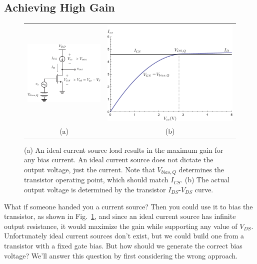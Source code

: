 \subsection{Achieving High Gain}
\begin{figure}[tb]
\centering
\begin{tabular}{cc}
\includegraphics[width=.45\columnwidth]{2cs_current_mirror_load.pdf} &
\includegraphics[width=.45\columnwidth]{mos_output_voltage.pdf}\\
(a) & (b)\\
\end{tabular}
\caption{(a) An ideal current source load results in the maximum gain for any bias current.  An ideal current source does not dictate the output voltage, just the current.  Note that $V_{bias,Q}$ determines the transistor operating point, which should match $I_{CS}$.  (b) The actual output voltage is determined by the transistor $I_{DS}$-$V_{DS}$ curve.}
\label{fig:2cs_current_mirror_load.pdf}
\end{figure}
What if someone handed you a current source?  Then you could use it to bias the transistor, as shown in Fig.~\ref{fig:2cs_current_mirror_load.pdf}, and since an ideal current source has infinite output resistance, it would maximize the gain while supporting any value of $V_{DS}$.  Unfortunately ideal current sources don't exist, but we could build one from a transistor with a fixed gate bias.  But how should we generate the correct bias voltage?  We'll answer this question by first considering the wrong approach.
